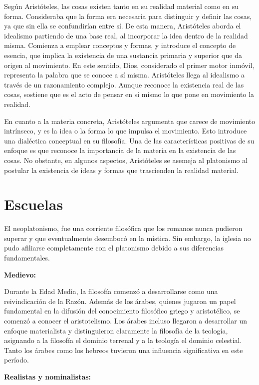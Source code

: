 \documentclass[
  jou,
  floatsintext,
  longtable,
  a4paper,
  nolmodern,
  notxfonts,
  notimes,
  12pt,
  colorlinks=true,linkcolor=blue,citecolor=blue,urlcolor=blue]{apa7}
\begin{document}
Según Aristóteles, las cosas existen tanto en su realidad material como
en su forma. Consideraba que la forma era necesaria para distinguir y
definir las cosas, ya que sin ella se confundirían entre sí. De esta
manera, Aristóteles aborda el idealismo partiendo de una base real, al
incorporar la idea dentro de la realidad misma. Comienza a emplear
conceptos y formas, y introduce el concepto de esencia, que implica la
existencia de una sustancia primaria y superior que da origen al
movimiento. En este sentido, Dios, considerado el primer motor inmóvil,
representa la palabra que se conoce a sí misma. Aristóteles llega al
idealismo a través de un razonamiento complejo. Aunque reconoce la
existencia real de las cosas, sostiene que es el acto de pensar en sí
mismo lo que pone en movimiento la realidad.

En cuanto a la materia concreta, Aristóteles argumenta que carece de
movimiento intrínseco, y es la idea o la forma lo que impulsa el
movimiento. Esto introduce una dialéctica conceptual en su filosofía.
Una de las características positivas de su enfoque es que reconoce la
importancia de la materia en la existencia de las cosas. No obstante, en
algunos aspectos, Aristóteles se asemeja al platonismo al postular la
existencia de ideas y formas que trascienden la realidad material.

\section{Escuelas}\label{escuelas}

El neoplatonismo, fue una corriente filosófica que los romanos nunca
pudieron superar y que eventualmente desembocó en la mística. Sin
embargo, la iglesia no pudo afiliarse completamente con el platonismo
debido a sus diferencias fundamentales.

\textbf{Medievo:}

Durante la Edad Media, la filosofía comenzó a desarrollarse como una
reivindicación de la Razón. Además de los árabes, quienes jugaron un
papel fundamental en la difusión del conocimiento filosófico griego y
aristotélico, se comenzó a conocer el aristotelismo. Los árabes incluso
llegaron a desarrollar un enfoque materialista y distinguieron
claramente la filosofía de la teología, asignando a la filosofía el
dominio terrenal y a la teología el dominio celestial. Tanto los árabes
como los hebreos tuvieron una influencia significativa en este período.

\textbf{Realistas y nominalistas:}
\end{document}
